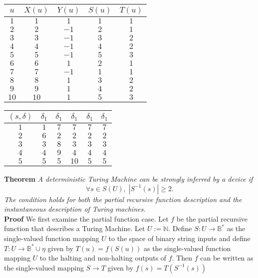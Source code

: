 \documentclass[11pt]{article}
\newcommand{\N}{\mathbb{N}}
\newcommand{\B}{\mathbb{B}}
\begin{document}
 \begin{center}
 \begin{tabular}{ c||c|c|c|c } 

 $ u $ & $ X(u) $ & $ Y(u) $ & $ S(u) $ & $ T(u) $ \\ 
 \hline
 \hline
 $ 1 $ & $ 1 $ & $ 1 $ & $ 1 $ & $ 1 $ \\
 \hline
 $ 2 $ & $ 2 $ & $ -1 $ & $ 2 $ & $ 1 $ \\
 \hline
 $ 3 $ & $ 3 $ & $ -1 $ & $ 3 $ & $ 2 $ \\
 \hline
 $ 4 $ & $ 4 $ & $ -1 $ & $ 4 $ & $ 2 $ \\
 \hline
 $ 5 $ & $ 5 $ & $ -1 $ & $ 5 $ & $ 3 $ \\
 \hline
 $ 6 $ & $ 6 $ & $ 1 $ & $ 2 $ & $ 1 $ \\
 \hline
 $ 7 $ & $ 7 $ & $ -1 $ & $ 1 $ & $ 1 $ \\
 \hline
 $ 8 $ & $ 8 $ & $ 1 $ & $ 3 $ & $ 2 $ \\
 \hline
 $ 9 $ & $ 9 $ & $ 1 $ & $ 4 $ & $ 2 $ \\
 \hline
 $ 10 $ & $ 10 $ & $ 1 $ & $ 5 $ & $ 3 $ \\ 
 \end{tabular} 
 \quad
 \begin{tabular}{ c||c|c|c|c|c } 

 $ (s, \delta) $ & $ \delta_1 $ & $ \delta_1 $ & $ \delta_1 $ & $ \delta_1 $ & $ \delta_1 $ \\ 
 \hline
 \hline
 $ 1 $ & $ 1 $ & $ 7 $ & $ 7 $ & $ 7 $ & $ 7 $ \\
 \hline
 $ 2 $ & $ 6 $ & $ 2 $ & $ 2 $ & $ 2 $ & $ 2 $ \\
 \hline
 $ 3 $ & $ 3 $ & $ 8 $ & $ 3 $ & $ 3 $ & $ 3 $ \\
 \hline
 $ 4 $ & $ 4 $ & $ 9 $ & $ 4 $ & $ 4 $ & $ 4 $ \\
 \hline 
 $ 5 $ & $ 5 $ & $ 5 $ & $ 10 $ & $ 5 $ & $ 5 $ \\
 
 \end{tabular}
 \end{center} 

\bigskip 
\bigskip
\textbf{Theorem} \quad \textit{A deterministic Turing Machine can be strongly inferred by a device if} 
$$\forall s \in S(U),\; |S^{-1}(s)| \geq 2. $$ \textit{The condition holds for both the partial recursive function description and the instantaneous description of Turing machines.} \\

\textbf{Proof} \quad We first examine the partial function case. Let $ f $ be the partial recursive function that describes a Turing Machine. Let $ U := \N $. Define $ S: U \rightarrow \B^{*} $ as the single-valued function mapping $ U $ to the space of binary string inputs and define $ T: U \rightarrow \B^{*} \cup \eta$ given by $T(u) = f(S(u)) $ as the single-valued function mapping $ U $ to the halting and non-halting outputs of $ f $. Then $ f $ can be written as the single-valued mapping $ S \rightarrow T $ given by $ f(s) = T(S^{-1}(s)) $ \\
\end{document}
